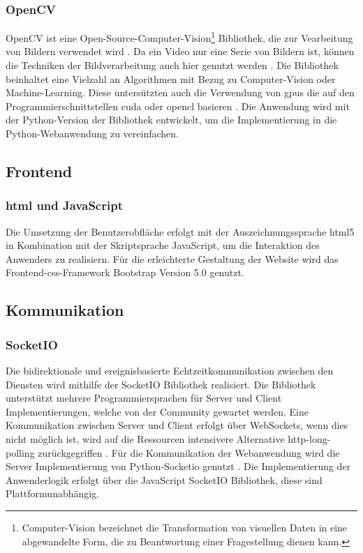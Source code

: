 \subsubsection{OpenCV}
OpenCV ist eine Open-Source-Computer-Vision\footnote{Computer-Vision bezeichnet die Transformation von visuellen Daten in eine abgewandelte Form, die zu Beantwortung einer Fragestellung dienen kann.} Bibliothek, die zur Vearbeitung von Bildern verwendet wird \cite{opencvintro}.
Da ein Video nur eine Serie von Bildern ist, können die Techniken der Bildverarbeitung auch hier genutzt werden \cite{ansari_core_2020}.
Die Bibliothek beinhaltet eine Vielzahl an Algorithmen mit Bezug zu Computer-Vision oder Machine-Learning.
Diese untersützten auch die Verwendung von \acp{gpu} die auf den Programmierschnittstellen \ac{cuda} oder \ac{opencl} basieren \cite{opencvpython}.
Die Anwendung wird mit der Python-Version der Bibliothek entwickelt, um die Implementierung in die Python-Webanwendung zu vereinfachen.



\subsection{Frontend}

\subsubsection{\ac{html} und JavaScript}
Die Umsetzung der Benutzerobfläche erfolgt mit der Auszeichnungssprache \acs{html}5 in Kombination
mit der Skriptsprache JavaScript, um die Interaktion des Anwenders zu realisiern.
Für die erleichterte Gestaltung der Website wird das Frontend-\acs{css}-Framework Bootstrap Version 5.0 genutzt.

\subsection{Kommunikation}

\subsubsection{SocketIO}
Die bidirektionale und ereignisbasierte Echtzeitkommunikation zwischen den Diensten wird mithilfe der SocketIO Bibliothek realisiert.
Die Bibliothek unterstützt mehrere Programmiersprachen für Server und Client Implementierungen, welche von der Community gewartet werden.
Eine Kommunikation zwischen Server und Client erfolgt über WebSockets, wenn dies nicht möglich ist, wird auf die Ressourcen intensivere \cite{httpwebsocket} Alternative \acs{http}-long-polling zurückgegriffen \cite{socketio}.
Für die Kommunikation der Webanwendung wird die Server Implementierung von Python-Socketio genutzt \cite{python-socketio}.
Die Implementierung der Anwenderlogik erfolgt über die JavaScript SocketIO Bibliothek, diese sind Plattformunabhängig.


